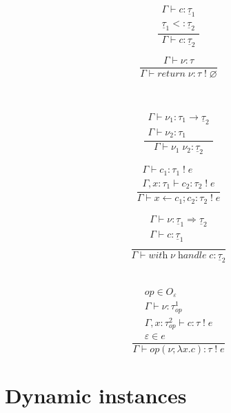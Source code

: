 \documentclass[12pt]{article}
\newcommand\eff[0]{\varepsilon}
\newcommand\Op[0]{O}
\newcommand\op[0]{op}
\newcommand\pty[1]{\ty^1_{#1}}
\newcommand\rty[1]{\ty^2_{#1}}
\newcommand\ty[0]{\tau}
\newcommand\tarr[2]{#1 \rightarrow #2}
\newcommand\thandler[2]{#1 \Rightarrow #2}
\newcommand\cty[0]{\underline{\ty}}
\newcommand\aty[2]{#1 \; ! \; #2}
\newcommand\val[0]{\nu}
\newcommand\comp[0]{c}
\newcommand\creturn[1]{\textit{return} \; #1}
\newcommand\capp[2]{#1 \; #2}
\newcommand\cdo[3]{#1 \leftarrow #2 ; #3}
\newcommand\cop[4]{#1(#2 ; \lambda #3 . #4)}
\newcommand\chandle[2]{\textit{with} \; #1 \; \textit{handle} \; #2}
\newcommand\subty[2]{#1 <: #2}
\begin{document}
\begin{minipage}{0.5\textwidth}
\[\frac{
	\begin{array}{l}
	\Gamma \vdash \comp : \cty_1 \\
	\subty{\cty_1}{\cty_2}
	\end{array}
}{
	\Gamma \vdash \comp : \cty_2
}\]
\end{minipage}
\begin{minipage}{0.5\textwidth}
\[\frac{
	\Gamma \vdash \val : \ty
}{
	\Gamma \vdash \creturn{\val} : \aty{\ty}{\varnothing}
}\]
\end{minipage}
\\
\begin{minipage}{0.333\textwidth}
\[\frac{
	\begin{array}{l}
	\Gamma \vdash \val_1 : \tarr{\ty_1}{\cty_2} \\
	\Gamma \vdash \val_2 : \ty_1
	\end{array}
}{
	\Gamma \vdash \capp{\val_1}{\val_2} : \cty_2
}\]
\end{minipage}
\begin{minipage}{0.333\textwidth}
\[\frac{
	\begin{array}{l}
	\Gamma \vdash \comp_1 : \aty{\ty_1}{e} \\
	\Gamma, x : \ty_1 \vdash \comp_2 : \aty{\ty_2}{e}
	\end{array}
}{
	\Gamma \vdash \cdo{x}{\comp_1}{\comp_2} : \aty{\ty_2}{e}
}\]
\end{minipage}
\begin{minipage}{0.333\textwidth}
\[\frac{
	\begin{array}{l}
	\Gamma \vdash \val : \thandler{\cty_1}{\cty_2} \\
	\Gamma \vdash \comp : \cty_1 \\
	\end{array}
}{
	\Gamma \vdash \chandle{\val}{\comp} : \cty_2
}\]
\end{minipage}
\\
\vspace{10pt}
\[\frac{
	\begin{array}{l}
	\op \in \Op_\eff\\
	\Gamma \vdash \val : \pty{\op} \\
	\Gamma , x : \rty{\op} \vdash \comp : \aty{\ty}{e} \\
	\eff \in e
	\end{array}
}{
	\Gamma \vdash \cop{\op}{\val}{x}{\comp} : \aty{\ty}{e}
}\]

\newpage
\section{Dynamic instances}
\end{document}
